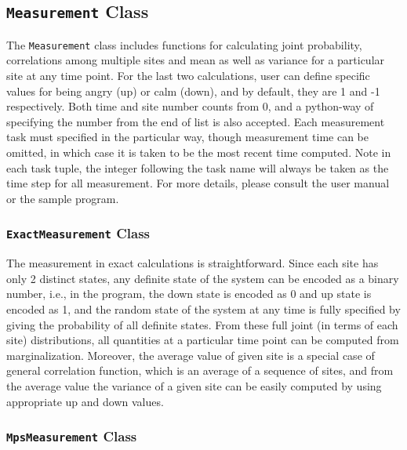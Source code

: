 \documentclass[english]{article}
\begin{document}
\subsection{\texttt{Measurement} Class}
The \texttt{Measurement} class includes functions for calculating joint probability, correlations among multiple sites and mean as well as variance for a particular site at any time point. For the last two calculations, user can define specific values for being angry (up) or calm (down), and by default, they are 1 and -1 respectively. Both time and site number counts from 0, and a python-way of specifying the number from the end of list is also accepted. Each measurement task must specified in the particular way, though measurement time can be omitted, in which case it is taken to be the most recent time computed. Note in each task tuple, the integer following the task name will always be taken as the time step for all measurement. For more details, please consult the user manual or the sample program.



\subsubsection{\texttt{ExactMeasurement} Class}

The measurement in exact calculations is straightforward. Since each site has only 2 distinct states, any definite state of the system can be encoded as a binary number, i.e., in  the program, the down state is encoded as 0 and up state is encoded as 1, and the random state of the system at any time is fully specified by giving the probability of all definite states. From these full joint (in terms of each site) distributions, all quantities at a particular time point can be computed from marginalization. Moreover, the average value of given site is a special case of general correlation function, which is an average of a sequence of sites, and from the average value the variance of a given site can be easily computed by using appropriate up and down values.



\subsubsection{\texttt{MpsMeasurement} Class}
\end{document}
